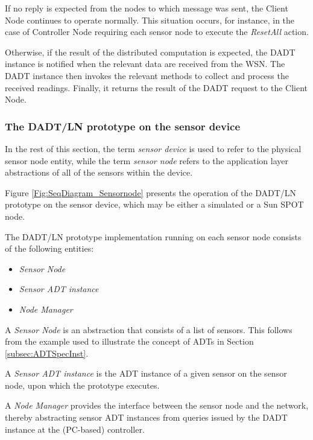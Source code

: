 If no reply is expected from the nodes to which message was sent, the
Client Node continues to operate normally. This situation occurs, for instance,
in the case of Controller Node requiring each sensor node to execute the \emph{ResetAll} action.
 
Otherwise, if the result of the distributed computation is expected, the DADT
instance is notified when the relevant data are received from the WSN.
The DADT instance then invokes the relevant methods to collect and process the received
readings. Finally, it returns the result of the DADT request to
the Client Node.

\subsubsection{The DADT/LN prototype on the sensor device} \label{subsubsec:DADTLNSensorDevice}

In the rest of this section, the term \emph{sensor device} is used to refer to the
physical sensor node entity, while the term \emph{sensor node} refers to the application
layer abstractions of all of the sensors within the device.

Figure \ref{Fig:SeqDiagram_Sensornode} presents the operation of the DADT/LN
prototype on the sensor device, which may be either a simulated or a Sun SPOT
node.

The DADT/LN prototype implementation running on each sensor node consists of the
following entities:

\begin{itemize}
  \item \emph{Sensor Node} 
  \item \emph{Sensor ADT instance} 
  \item \emph{Node Manager} 
\end{itemize}

A \emph{Sensor Node} is an abstraction that consists of a list of sensors. This
follows from the example used to illustrate the concept of ADTs in Section
\ref{subsec:ADTSpecInst}. 

A \emph{Sensor ADT instance} is the ADT instance of a given sensor on the sensor
node, upon which the prototype executes.

A \emph{Node Manager} provides the interface between the sensor node and the
network, thereby abstracting sensor ADT instances from queries issued by the DADT
instance at the (PC-based) controller.

